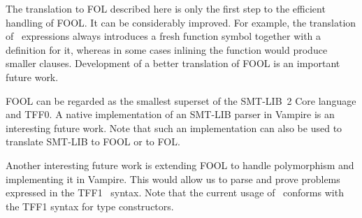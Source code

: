 The translation to FOL described here is only the first step to the efficient handling of FOOL. It can be considerably improved. For example, the translation of \LETIN\ expressions always introduces a fresh function symbol together with a definition for it, whereas in some cases inlining the function would produce smaller clauses. Development of a better translation of FOOL is an important future work.

FOOL can be regarded as the smallest superset of the SMT-LIB~2 Core language and TFF0. A native implementation of an SMT-LIB parser in Vampire is an interesting future work. Note that such an implementation can also be used to translate SMT-LIB to FOOL or to FOL.

Another interesting future work is extending FOOL to handle polymorphism and implementing it in Vampire. This would allow us to parse and prove problems expressed in the TFF1~\cite{tff1} syntax. Note that the current usage of \darraySymb\ conforms with the TFF1 syntax for type constructors.
